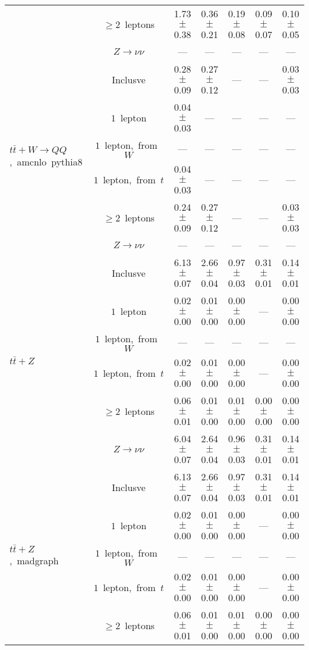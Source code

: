 \documentclass{article}
\begin{document}
\begin{longtable}{|l|c|c|c|c|c|c|}
 & $\ge2$~leptons  & 1.73 $\pm$ 0.38  & 0.36 $\pm$ 0.21  & 0.19 $\pm$ 0.08  & 0.09 $\pm$ 0.07  & 0.10 $\pm$ 0.05 \\* 
 & $Z\rightarrow\nu\nu$  & ---  & ---  & ---  & ---  & --- \\* 
\hline 
\multirow{6}{*}{$t\bar{t}+W{\rightarrow}QQ$,~amcnlo~pythia8} & Inclusve  & 0.28 $\pm$ 0.09  & 0.27 $\pm$ 0.12  & ---  & ---  & 0.03 $\pm$ 0.03 \\* 
 & $1$~lepton  & 0.04 $\pm$ 0.03  & ---  & ---  & ---  & --- \\* 
 & $1$~lepton,~from~$W$  & ---  & ---  & ---  & ---  & --- \\* 
 & $1$~lepton,~from~$t$  & 0.04 $\pm$ 0.03  & ---  & ---  & ---  & --- \\* 
 & $\ge2$~leptons  & 0.24 $\pm$ 0.09  & 0.27 $\pm$ 0.12  & ---  & ---  & 0.03 $\pm$ 0.03 \\* 
 & $Z\rightarrow\nu\nu$  & ---  & ---  & ---  & ---  & --- \\* 
\hline 
\multirow{6}{*}{$t\bar{t}+Z$} & Inclusve  & 6.13 $\pm$ 0.07  & 2.66 $\pm$ 0.04  & 0.97 $\pm$ 0.03  & 0.31 $\pm$ 0.01  & 0.14 $\pm$ 0.01 \\* 
 & $1$~lepton  & 0.02 $\pm$ 0.00  & 0.01 $\pm$ 0.00  & 0.00 $\pm$ 0.00  & ---  & 0.00 $\pm$ 0.00 \\* 
 & $1$~lepton,~from~$W$  & ---  & ---  & ---  & ---  & --- \\* 
 & $1$~lepton,~from~$t$  & 0.02 $\pm$ 0.00  & 0.01 $\pm$ 0.00  & 0.00 $\pm$ 0.00  & ---  & 0.00 $\pm$ 0.00 \\* 
 & $\ge2$~leptons  & 0.06 $\pm$ 0.01  & 0.01 $\pm$ 0.00  & 0.01 $\pm$ 0.00  & 0.00 $\pm$ 0.00  & 0.00 $\pm$ 0.00 \\* 
 & $Z\rightarrow\nu\nu$  & 6.04 $\pm$ 0.07  & 2.64 $\pm$ 0.04  & 0.96 $\pm$ 0.03  & 0.31 $\pm$ 0.01  & 0.14 $\pm$ 0.01 \\* 
\hline 
\multirow{6}{*}{$t\bar{t}+Z$,~madgraph} & Inclusve  & 6.13 $\pm$ 0.07  & 2.66 $\pm$ 0.04  & 0.97 $\pm$ 0.03  & 0.31 $\pm$ 0.01  & 0.14 $\pm$ 0.01 \\* 
 & $1$~lepton  & 0.02 $\pm$ 0.00  & 0.01 $\pm$ 0.00  & 0.00 $\pm$ 0.00  & ---  & 0.00 $\pm$ 0.00 \\* 
 & $1$~lepton,~from~$W$  & ---  & ---  & ---  & ---  & --- \\* 
 & $1$~lepton,~from~$t$  & 0.02 $\pm$ 0.00  & 0.01 $\pm$ 0.00  & 0.00 $\pm$ 0.00  & ---  & 0.00 $\pm$ 0.00 \\* 
 & $\ge2$~leptons  & 0.06 $\pm$ 0.01  & 0.01 $\pm$ 0.00  & 0.01 $\pm$ 0.00  & 0.00 $\pm$ 0.00  & 0.00 $\pm$ 0.00 \\* 

\end{longtable}
\end{document}
